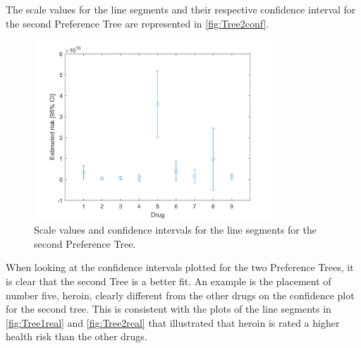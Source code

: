 \noindent
%
The scale values for the line segments and their respective confidence interval for the second Preference Tree are represented in \autoref{fig:Tree2conf}.
%
\begin{figure}[H]
	\centering
	\includegraphics[width = 0.80\textwidth]{Figure/confidense_p1414}
	\caption{Scale values and confidence intervals for the line segments for the second Preference Tree.}
	\label{fig:Tree2conf}
\end{figure}
\noindent
%
When looking at the confidence intervals plotted for the two Preference Trees, it is clear that the second Tree is a better fit. An example is the placement of number five, heroin, clearly different from the other drugs on the confidence plot for the second tree. This is consistent with the plots of the line segments in \autoref{fig:Tree1real} and \autoref{fig:Tree2real} that illustrated that heroin is rated a higher health risk than the other drugs. 